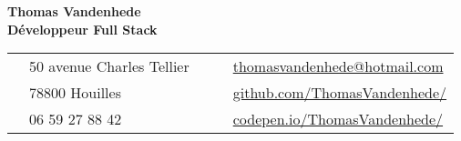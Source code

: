 \documentclass[10pt, a4paper]{article}
\def\GithubIcon{{\FA \faGithub}}
\def\CodepenIcon{{\FA \faCodepen}}
\def\EnvelopeIcon{{\FA \faEnvelopeO}}
\def\MapMarkerIcon{{\FA \faMapMarker}}
\def\PhoneIcon{{\FA \faPhone}}
\begin{document}
\begin{minipage}[t]{\textwidth}
	\begin{minipage}{0.39\textwidth}
		\textbf{\large Thomas Vandenhede}\\
		
		\textbf{\Large Développeur Full Stack}
	\end{minipage}
	\begin{minipage}{0.4\textwidth}
		\begin{tabularx}{\linewidth}{@{}l l X c l@{}}
			\MapMarkerIcon	& 50 avenue Charles Tellier		& & \EnvelopeIcon	& \href{mailto:thomasvandenhede@hotmail.com}{thomasvandenhede@hotmail.com}\\
			& 78800 Houilles				& & \GithubIcon		& \href{https://github.com/ThomasVandenhede/}{github.com/ThomasVandenhede/}\\
			\PhoneIcon		& 06 59 27 88 42				& & \CodepenIcon	& \href{https://codepen.io/ThomasVandenhede/}{codepen.io/ThomasVandenhede/}\\
		\end{tabularx}
	\end{minipage}
\end{minipage}
\smallskip

\end{document}
